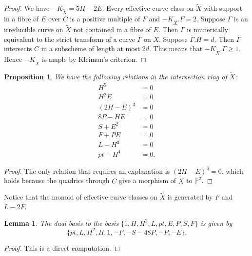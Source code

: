 \documentclass[11pt]{amsart}
\theoremstyle{plain}
\newtheorem{proposition}[theorem]{Proposition}
\newtheorem{lemma}[theorem]{Lemma}
\numberwithin{equation}{section}
\theoremstyle{definition}
\theoremstyle{remark}
\renewcommand{\P}{\mathbb P}
\begin{document}
\begin{proof}
 We have $-K_{\widetilde{X}} = 5H - 2E$. Every effective curve class on $\widetilde{X}$ with support in a fibre of $E$ over $C$ is a positive multiple of $F$ and $-K_{\widetilde{X}}.F = 2$. Suppose $\Gamma$ is an irreducible curve on $\widetilde{X}$ not contained in a fibre of $E$. Then $\Gamma$ is numerically equivalent to the strict transform of a curve $\overline{\Gamma}$ on $X$. Suppose $\overline{\Gamma}.H =d$. Then $\overline{\Gamma}$ intersects $C$ in a subscheme of length at most $2d$. This means that  $-K_{\widetilde{X}}.\Gamma \ge  1$. Hence  $-K_{\widetilde{X}}$ is ample by Kleiman's criterion.
\end{proof}

\begin{proposition}\label{pRelationsINtersectionRing}
We have the following relations in the intersection ring of $\widetilde{X}$:
\begin{align*}
H^5 &= 0 \\
H^2 E &= 0 \\
(2H -E)^3 &= 0 \\
8P - HE &= 0 \\
S + E^2 &= 0 \\
F + PE &= 0 \\
L - H^3 &= 0 \\
pt - H^4 &= 0.
\end{align*}
\end{proposition}

\begin{proof}
The only relation that requires an explanation is $(2H -E)^3=0$, which holds because the quadrics through $C$ give a morphism of $\widetilde{X}$ to $\P^2$.
\end{proof}

Notice that the monoid of effective curve classes on $\widetilde{X}$ is generated by $F$ and $L-2F$. 

\begin{lemma}\label{lDualBasis}
The dual basis to the basis  $\{1,H,H^2,L,pt,E,P,S,F\}$ is given by
\[
\{ pt,L,H^2,H,1,-F,-S-48P,-P,-E\}. 
\]
\end{lemma}

\begin{proof}
This is a direct computation.
\end{proof}
\end{document}
